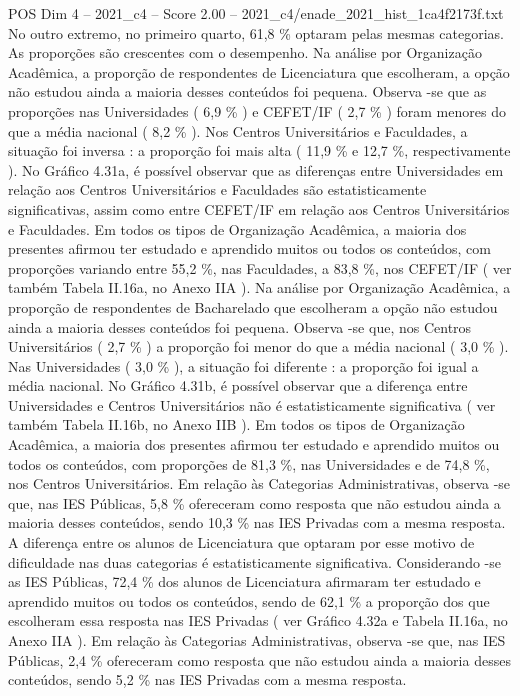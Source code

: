 \begin{textsample}{POS Dim 4 – 2021\_c4 – Score 2.00 – 2021\_c4/enade\_2021\_hist\_1ca4f2173f.txt}
No outro extremo, no primeiro quarto, 61,8 \% optaram pelas mesmas categorias.
As proporções são crescentes com o desempenho.
Na análise por Organização Acadêmica, a proporção de respondentes de Licenciatura que escolheram, a opção não estudou ainda a maioria desses conteúdos foi pequena.
Observa -se que as proporções nas Universidades ( 6,9 \% ) e CEFET/IF ( 2,7 \% ) foram menores do que a média nacional ( 8,2 \% ).
Nos Centros Universitários e Faculdades, a situação foi inversa : a proporção foi mais alta ( 11,9 \% e 12,7 \%, respectivamente ).
No Gráfico 4.31a, é possível observar que as diferenças entre Universidades em relação aos Centros Universitários e Faculdades são estatisticamente significativas, assim como entre CEFET/IF em relação aos Centros Universitários e Faculdades.
Em todos os tipos de Organização Acadêmica, a maioria dos presentes afirmou ter estudado e aprendido muitos ou todos os conteúdos, com proporções variando entre 55,2 \%, nas Faculdades, a 83,8 \%, nos CEFET/IF ( ver também Tabela II.16a, no Anexo IIA ).
Na análise por Organização Acadêmica, a proporção de respondentes de Bacharelado que escolheram a opção não estudou ainda a maioria desses conteúdos foi pequena.
Observa -se que, nos Centros Universitários ( 2,7 \% ) a proporção foi menor do que a média nacional ( 3,0 \% ).
Nas Universidades ( 3,0 \% ), a situação foi diferente : a proporção foi igual a média nacional.
No Gráfico 4.31b, é possível observar que a diferença entre Universidades e Centros Universitários não é estatisticamente significativa ( ver também Tabela II.16b, no Anexo IIB ).
Em todos os tipos de Organização Acadêmica, a maioria dos presentes afirmou ter estudado e aprendido muitos ou todos os conteúdos, com proporções de 81,3 \%, nas Universidades e de 74,8 \%, nos Centros Universitários.
Em relação às Categorias Administrativas, observa -se que, nas IES Públicas, 5,8 \% ofereceram como resposta que não estudou ainda a maioria desses conteúdos, sendo 10,3 \% nas IES Privadas com a mesma resposta.
A diferença entre os alunos de Licenciatura que optaram por esse motivo de dificuldade nas duas categorias é estatisticamente significativa.
Considerando -se as IES Públicas, 72,4 \% dos alunos de Licenciatura afirmaram ter estudado e aprendido muitos ou todos os conteúdos, sendo de 62,1 \% a proporção dos que escolheram essa resposta nas IES Privadas ( ver Gráfico 4.32a e Tabela II.16a, no Anexo IIA ).
Em relação às Categorias Administrativas, observa -se que, nas IES Públicas, 2,4 \% ofereceram como resposta que não estudou ainda a maioria desses conteúdos, sendo 5,2 \% nas IES Privadas com a mesma resposta.

\end{textsample}

